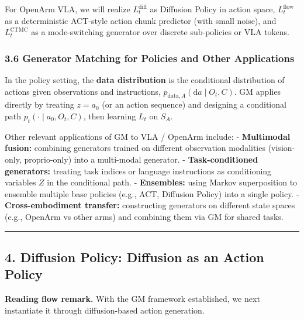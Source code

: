 \documentclass[
]{article}
\theoremstyle{remark}
\begin{document}
For OpenArm VLA, we will realize \(L_t^{\text{diff}}\) as Diffusion
Policy in action space, \(L_t^{\text{flow}}\) as a deterministic
ACT-style action chunk predictor (with small noise), and
\(L_t^{\text{CTMC}}\) as a mode-switching generator over discrete
sub-policies or VLA
tokens. \cite{act-project-page,diffusion-policy2023,diffpolicy-theory-notes,openvla-notes,act-openarm-notes}

\subsubsection{3.6 Generator Matching for Policies and Other
Applications}\label{generator-matching-for-policies-and-other-applications}

In the policy setting, the \textbf{data distribution} is the conditional
distribution of actions given observations and instructions,
\(p_{\text{data},A}(\mathrm{d}a \mid O_t, C)\). GM applies directly by
treating \(z = a_0\) (or an action sequence) and designing a conditional
path \(p_t(\cdot\mid a_0, O_t, C)\), then learning \(L_t\) on
\(S_A\). \cite{diffusion-policy2023,diffpolicy-theory-notes}

Other relevant applications of GM to VLA / OpenArm
include: \cite{gm-companion-notes,gm2025} - \textbf{Multimodal fusion:} combining
generators trained on different observation modalities (vision-only,
proprio-only) into a multi-modal generator. - \textbf{Task-conditioned
generators:} treating task indices or language instructions as
conditioning variables \(Z\) in the conditional path. -
\textbf{Ensembles:} using Markov superposition to ensemble multiple base
policies (e.g., ACT, Diffusion Policy) into a single policy. -
\textbf{Cross-embodiment transfer:} constructing generators on different
state spaces (e.g., OpenArm vs other arms) and combining them via GM for
shared tasks.

\begin{center}\rule{0.5\linewidth}{0.5pt}\end{center}

\subsection{4. Diffusion Policy: Diffusion as an Action
Policy}\label{diffusion-policy-diffusion-as-an-action-policy}

\textbf{Reading flow remark.} With the GM framework established, we next instantiate it through diffusion-based action generation.
\end{document}

